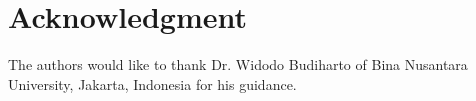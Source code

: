 \documentclass[conference]{IEEEtran}
\begin{document}
%
%
%



\section*{Acknowledgment}

The authors would like to thank Dr. Widodo Budiharto of Bina Nusantara University, Jakarta, Indonesia for his guidance.


\ifCLASSOPTIONcaptionsoff
  \newpage
\fi




%
%
%



\end{document}
